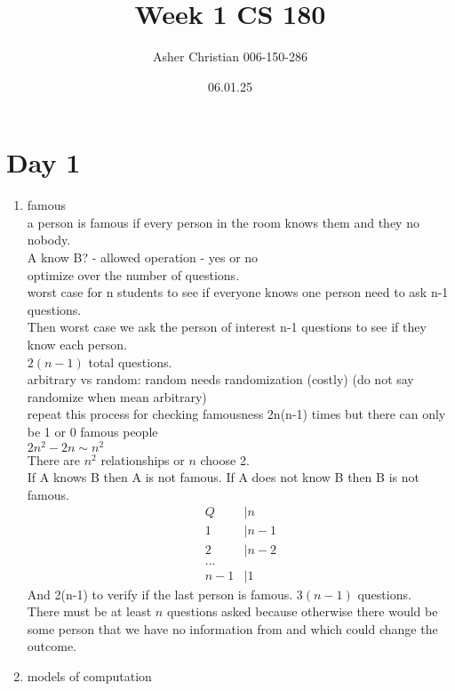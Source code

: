 \documentclass{amsart}
\title{Week 1 CS 180}
\author{Asher Christian 006-150-286}
\date{ 06.01.25}
\begin{document}
\maketitle
\section{Day 1}
\begin{enumerate}
    \item famous\\
        a person is famous if every person in the room knows them and they no nobody.\\
        A know B? - allowed operation - yes or no\\
        optimize over the number of questions.\\
        worst case for n students to see if everyone knows one person need to ask n-1 questions.\\
        Then worst case we ask the person of interest n-1 questions to see if they know each person.\\
        $2(n-1)$ total questions.\\
        arbitrary vs random: random needs randomization (costly) (do not say randomize when mean arbitrary)\\
        repeat this process for checking famousness 2n(n-1) times but there can only be 1 or 0 famous people\\
        $2n^2-2n \sim n^2$ \\
        There are $n^2$ relationships or $n$ choose 2.\\
        If A knows B then A is not famous. If A does not know B then B is not famous.\\
        \begin{align*}
            Q &| n\\
            1 &| n-1\\
            2 &| n-2\\
            ...\\
            n-1 &| 1
        \end{align*}
        And 2(n-1) to verify if the last person is famous.
        $3(n-1)$ questions.\\
        There must be at least $n$ questions asked because otherwise there would be some person that we have no information from and which could change the outcome.\\
    \item models of computation\\

\end{enumerate}
\end{document}
